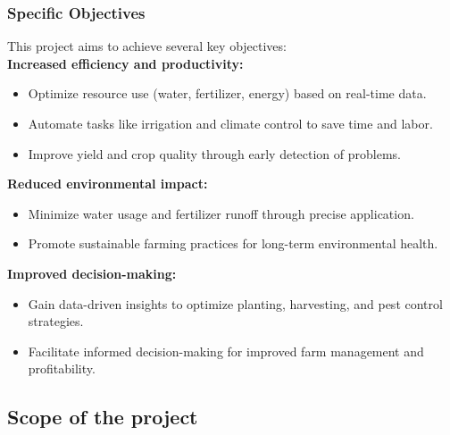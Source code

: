 \documentclass[12pt, a4paper]{article}
\begin{document}
\subsubsection{Specific Objectives}
This project aims to achieve several key objectives:\\
\textbf{Increased efficiency and productivity:}
\begin{itemize}
 \item Optimize resource use (water, fertilizer, energy) based on real-time data.
 \item Automate tasks like irrigation and climate control to save time and labor.
 \item Improve yield and crop quality through early detection of problems.
\end{itemize}
\textbf{Reduced environmental impact:}
\begin{itemize}
 \item Minimize water usage and fertilizer runoff through precise application.
 \item Promote sustainable farming practices for long-term environmental health.
\end{itemize}
\textbf{Improved decision-making:}
\begin{itemize}
 \item Gain data-driven insights to optimize planting, harvesting, and pest control strategies.
 \item Facilitate informed decision-making for improved farm management and profitability.
\end{itemize}

\newpage
\subsection{Scope of the project}

\newpage
\end{document}
